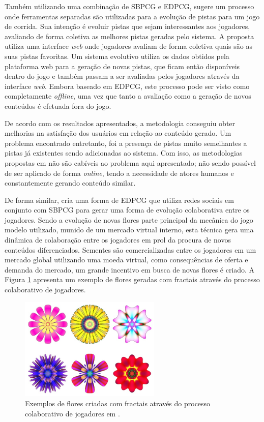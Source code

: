 Também utilizando uma combinação de SBPCG e EDPCG, \cite{cardamone2011interactive} sugere um processo onde ferramentas separadas são utilizadas para a evolução de pistas para um jogo de corrida. Sua intenção é evoluir pistas que sejam interessantes aos jogadores, avaliando de forma coletiva as melhores pistas geradas pelo sistema. A proposta utiliza uma interface \emph{web} onde jogadores avaliam de forma coletiva quais são as suas pistas favoritas. Um sistema evolutivo utiliza os dados obtidos pela plataforma web para a geração de novas pistas, que ficam então disponíveis dentro do jogo e também passam a ser avaliadas pelos jogadores através da interface \emph{web}. Embora baseado em EDPCG, este processo pode ser visto como completamente \emph{offline}, uma vez que tanto a avaliação como a geração de novos conteúdos é efetuada fora do jogo.

De acordo com os resultados apresentados, a metodologia conseguiu obter melhorias na satisfação dos usuários em relação ao conteúdo gerado. Um problema encontrado entretanto, foi a presença de pistas muito semelhantes a pistas já existentes sendo adicionadas ao sistema. Com isso, as metodologias propostas em \cite{cardamone2011interactive} não são cabíveis ao problema aqui apresentado; não sendo possível de ser aplicado de forma \emph{online}, tendo a necessidade de atores humanos e constantemente gerando conteúdo similar.

De forma similar, \cite{risi2012combining} cria uma forma de EDPCG que utiliza redes sociais em conjunto com SBPCG para gerar uma forma de evolução colaborativa entre os jogadores. Sendo a evolução de novas flores parte principal da mecânica do jogo modelo utilizado, munido de um mercado virtual interno, esta técnica gera uma dinâmica de colaboração entre os jogadores em prol da procura de novos conteúdos diferenciados. Sementes são comercializadas entre os jogadores em um mercado global utilizando uma moeda virtual, como consequências de oferta e demanda do mercado, um grande incentivo em busca de novas flores é criado. A Figura \ref{fig:risi2012combining} apresenta um exemplo de flores geradas com fractais através do processo colaborativo de jogadores.

\begin{figure}[htb]
	\begin{center}
		\includegraphics[width=0.6\textwidth]{Imagens/risi2012combining.jpg}
		\caption{Exemplos de flores criadas com fractais através do processo colaborativo de jogadores em \cite{risi2012combining}.}
		\label{fig:risi2012combining}
	\end{center}
\end{figure}

